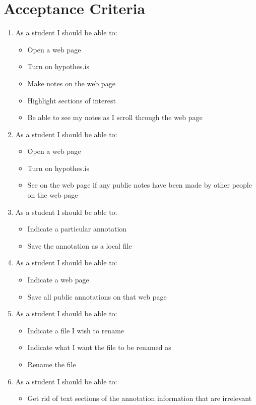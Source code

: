 \documentclass{article}
\begin{document}
\section{Acceptance Criteria}
\begin{enumerate}
\item As a student I should be able to:
\begin{itemize}
\item Open a web page
\item Turn on hypothes.is
\item Make notes on the web page
\item Highlight sections of interest
\item Be able to see my notes as I scroll through the web page
\end{itemize}
\item As a student I should be able to:
\begin{itemize}
\item Open a web page
\item Turn on hypothes.is
\item See on the web page if any public notes have been made by other people on the web page
\end{itemize}
\item As a student I should be able to:
\begin{itemize}
\item Indicate a particular annotation
\item Save the annotation as a local file
\end{itemize}
\item As a student I should be able to:
\begin{itemize}
\item Indicate a web page 
\item Save all public annotations on that web page
\end{itemize}
\item As a student I should be able to:
\begin{itemize}
\item Indicate a file I wish to rename
\item Indicate what I want the file to be renamed as
\item Rename the file
\end{itemize}
\item As a student I should be able to:
\begin{itemize}
\item Get rid of text sections of the annotation information that are irrelevant 

\end{itemize}
\end{enumerate}
\end{document}
